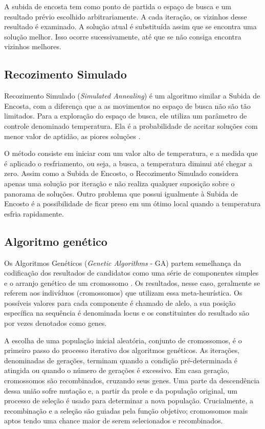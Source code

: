 A subida de encosta tem como ponto de partida o espaço de busca e um resultado prévio escolhido arbitrariamente. A cada iteração, os vizinhos desse resultado é examinado. A solução atual é substituída assim que se encontra uma solução melhor. Isso ocorre sucessivamente, até que se não consiga encontra vizinhos melhores.  

\subsection{Recozimento Simulado}

Recozimento Simulado (\textit{Simulated Annealing}) é um algoritmo similar a Subida de Encosta, com a diferença que a as movimentos no espaço de busca não são tão limitados. Para a exploração do espaço de busca, ele utiliza um parâmetro de controle denominado temperatura. Ela é a probabilidade de aceitar soluções com menor valor de aptidão, as piores soluções \cite{kirkpatrick1983optimization}.

O método consiste em iniciar com um valor alto de temperatura, e a medida que é aplicado o resfriamento, ou seja, a busca, a temperatura diminui até chegar a zero. Assim como a Subida de Encosto, o Recozimento Simulado considera apenas uma solução por iteração e não realiza qualquer suposição sobre o panorama de soluções. Outro problema que possui igualmente à Subida de Encosto é a possibilidade de ficar preso em um ótimo local quando a temperatura esfria rapidamente.

\subsection{Algoritmo genético}

Os Algoritmos Genéticos (\textit{Genetic Algorithms} - GA) partem semelhança da codificação dos resultados de candidatos como uma série de componentes simples e o arranjo genético de um cromossomo \cite{alander1998genetic}. Os resultados, nesse caso, geralmente se referem aos indivíduos (cromossomos) que utilizam essa meta-heurística. Os possíveis valores para cada componente é chamado de alelo, a sua posição específica na sequência é denominada locus e os constituintes do resultado são por vezes denotados como genes.

A escolha de uma população inicial aleatória, conjunto de cromossomos, é o primeiro passo do processo iterativo dos algoritmos genéticos. As iterações, denominadas de gerações, terminam quando a condição pré-determinada é atingida ou quando o número de gerações é excessivo. Em casa geração, cromossomos são recombinados, cruzando seus genes. Uma parte da descendência dessa união sofre mutação e, a partir da prole e da população original, um processo de seleção é usado para determinar a nova população. Crucialmente, a recombinação e a seleção são guiadas pela função objetivo; cromossomos mais aptos tendo uma chance maior de serem selecionados e recombinados.

